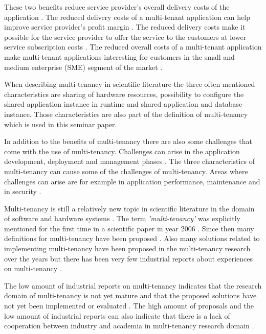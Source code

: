 \documentclass[conference]{sasmoota2017}
\begin{document}
These two benefits reduce service provider's overall delivery costs of the application \cite{Bezemer:2010:MaintenanceDream}. The reduced delivery costs of a multi-tenant application can help improve service provider's profit margin \cite{Guo:2007:FrameworkForNative}. The reduced delivery costs make it possible for the service provider to offer the service to the customers at lower service subscription costs \cite{Guo:2007:FrameworkForNative}. The reduced overall costs of a multi-tenant application make multi-tenant applications interesting for customers in the small and medium enterprise (SME) segment of the market \cite{Bezemer:2010:MaintenanceDream}.

When describing multi-tenancy in scientific literature the three often mentioned characteristics are sharing of hardware resources, possibility to configure the shared application instance in runtime and shared application and database instance. Those characteristics are also part of the definition of multi-tenancy which is used in this seminar paper. 

In addition to the benefits of multi-tenancy there are also some challenges that come with the use of multi-tenancy. Challenges can arise in the application development, deployment and management phases \cite{Guo:2007:FrameworkForNative}. The three characteristics of multi-tenancy can cause some of the challenges of multi-tenancy. Areas where challenges can arise are for example in application performance, maintenance and in security \cite{Bezemer:2010:MaintenanceDream}. 

Multi-tenancy is still a relatively new topic in scientific literature in the domain of software and hardware systems \cite{Kabbedijk2015:Defining}. The term \textit{'multi-tenancy'} was explicitly mentioned for the first time in a scientific paper in year 2006 \cite{Kabbedijk2015:Defining, Carraro:2006:ArchitectureLongTail}. Since then many definitions for multi-tenancy have been proposed \cite{Kabbedijk2015:Defining}. Also many solutions related to implementing multi-tenancy have been proposed in the multi-tenancy research over the years but there has been very few industrial reports about experiences on multi-tenancy \cite{Kabbedijk2015:Defining}. 

The low amount of industrial reports on multi-tenancy indicates that the research domain of multi-tenancy is not yet mature and that the proposed solutions have not yet been implemented or evaluated \cite{Kabbedijk2015:Defining}. The high amount of proposals and the low amount of industrial reports can also indicate that there is a lack of cooperation between industry and academia in multi-tenancy research domain \cite{Kabbedijk2015:Defining}.
\end{document}
